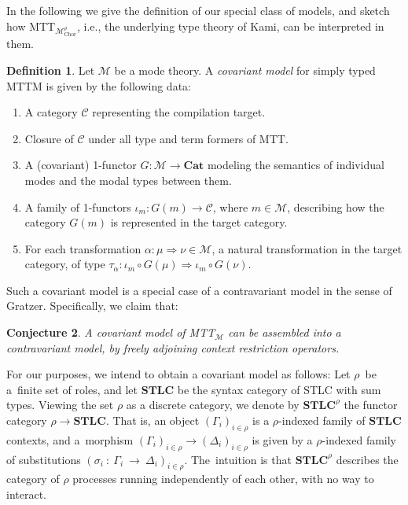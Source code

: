 \documentclass{scrartcl}
\theoremstyle{definition}
\newtheorem{definition}{Definition}
\theoremstyle{plain}
\newtheorem{conjecture}[definition]{Conjecture}
\newcommand{\MTTM}{MTT${}_{\mathcal{M}}$}
\begin{document}
In the following we give the definition of our special class of models, and
sketch how MTT${}_{\mathcal{M}^\rho_{\textrm{Chor}}}$, i.e., the underlying
type theory of Kami, can be interpreted in them.
\begin{definition}
  Let $\mathcal{M}$ be a mode theory. A \emph{covariant model} for simply typed
  MTTM{} is given by the following data:
  \begin{enumerate}
  \item
    A category $\mathcal{C}$ representing the compilation target.
  \item
    Closure of $\mathcal{C}$ under all type and term formers of MTT.
  \item
    A (covariant) 1-functor $G : \mathcal{M} \to \textbf{Cat}$ modeling the
    semantics of individual modes and the modal types between them.
  \item
    A family of 1-functors $\iota_m : G(m) \to \mathcal{C}$, where $m \in
    \mathcal{M}$, describing how the category $G(m)$ is represented in the
    target category.
  \item
    For each transformation $\alpha : \mu \Rightarrow \nu \in \mathcal{M}$, a
    natural transformation in the target category, of type $\tau_\alpha :
    \iota_m \circ G(\mu) \Rightarrow \iota_m \circ G(\nu)$.
  \end{enumerate}
\end{definition}
Such a covariant model is a special case of a contravariant model in the sense
of Gratzer. Specifically, we claim that:
\begin{conjecture}
  A covariant model of {\upshape \MTTM{}} can be assembled into a contravariant
  model, by freely adjoining context restriction operators.
\end{conjecture}
For our purposes, we intend to obtain a covariant model as follows: Let
$\rho$~be a~finite set of roles, and let $\textbf{STLC}$ be the syntax category
of STLC with sum types. Viewing the set $\rho$ as a discrete category, we
denote by $\textbf{STLC}^\rho$ the functor category $\rho \to \textbf{STLC}$.
That is, an object $(\Gamma_i)_{i\in\rho}$ is a $\rho$-indexed family of
$\textbf{STLC}$ contexts, and a~morphism $(\Gamma_i)_{i\in\rho} \to
(\Delta_i)_{i\in\rho}$ is given by a $\rho$-indexed family of substitutions
$(\sigma_i~:~\Gamma_i~\to~\Delta_i)_{i\in\rho}$. The~intuition is that
$\textbf{STLC}^\rho$ describes the category of $\rho$ processes running
independently of each other, with no way to interact.
\end{document}
